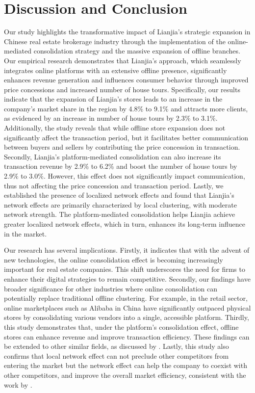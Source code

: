 \documentclass[11pt]{article}
\begin{document}
\section{Discussion and Conclusion} \label{sec:conclusion}

Our study highlights the transformative impact of Lianjia's strategic expansion in Chinese real estate brokerage industry through the implementation of the online-mediated consolidation strategy and the massive expansion of offline branches. Our empirical research demonstrates that Lianjia's approach, which seamlessly integrates online platforms with an extensive offline presence, significantly enhances revenue generation and influences consumer behavior through improved price concessions and increased number of house tours. Specifically, our results indicate that the expansion of Lianjia's stores leads to an increase in the company's market share in the region by 4.8\% to 9.1\% and attracts more clients, as evidenced by an increase in number of house tours by 2.3\% to 3.1\%. Additionally, the study reveals that while offline store expansion does not significantly affect the transaction period, but it facilitates better communication between buyers and sellers by contributing the price concession in transaction. Secondly, Lianjia's platform-mediated consolidation can also increase its transaction revenue by 2.9\% to 6.2\% and boost the number of house tours by 2.9\% to 3.0\%. However, this effect does not significantly impact communication, thus not affecting the price concession and transaction period. Lastly, we established the presence of localized network effects and found that Lianjia's network effects are primarily characterized by local clustering, with moderate network strength. The platform-mediated consolidation helps Lianjia achieve greater localized network effects, which in turn, enhances its long-term influence in the market.

Our research has several implications. Firstly, it indicates that with the advent of new technologies, the online consolidation effect is becoming increasingly important for real estate companies. This shift underscores the need for firms to enhance their digital strategies to remain competitive. Secondly, our findings have broader significance for other industries where online consolidation can potentially replace traditional offline clustering. For example, in the retail sector, online marketplaces such as Alibaba in China have significantly outpaced physical stores by consolidating various vendors into a single, accessible platform. Thirdly, this study demonstrates that, under the platform's consolidation effect, offline stores can enhance revenue and improve transaction efficiency. These findings can be extended to other similar fields, as discussed by \citep{10.1257/jep.28.2.3}. Lastly, this study also confirms that local network effect can not preclude other competitors from entering the market but the network effect can help the company to coexist with other competitors, and improve the overall market efficiency, consistent with the work by \citep{gilbukh_goldsmith-pinkham_2019}.
\end{document}
